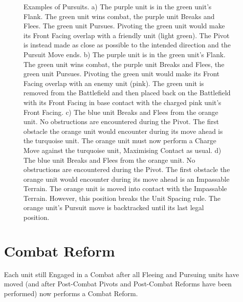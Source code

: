 \begin{figure}[!htbp]
\begin{minipage}{0.53\textwidth}
\def\svgwidth{\textwidth}

\end{minipage}\hfill\begin{minipage}{0.44\textwidth}
\caption{Examples of Pursuits.\captionpar
a) The purple unit is in the green unit's Flank. The green unit wins combat, the purple unit Breaks and Flees. The green unit Pursues. Pivoting the green unit would make its Front Facing overlap with a friendly unit (light green). The Pivot is instead made as close as possible to the intended direction and the Pursuit Move ends.\vspace*{1.5cm}\captionpar
b) The purple unit is in the green unit's Flank. The green unit wins combat, the purple unit Breaks and Flees, the green unit Pursues. Pivoting the green unit would make its Front Facing overlap with an enemy unit (pink). The green unit is removed from the Battlefield and then placed back on the Battlefield with its Front Facing in base contact with the charged pink unit's Front Facing.\vspace*{3.5cm}\captionpar
c) The blue unit Breaks and Flees from the orange unit. No obstructions are encountered during the Pivot. The first obstacle the orange unit would encounter during its move ahead is the turquoise unit. The orange unit must now perform a Charge Move against the turquoise unit, Maximising Contact as usual.\vspace*{4cm}\captionpar
d) The blue unit Breaks and Flees from the orange unit. No obstructions are encountered during the Pivot. The first obstacle the orange unit would encounter during its move ahead is an Impassable Terrain. The orange unit is moved into contact with the Impassable Terrain. However, this position breaks the Unit Spacing rule. The orange unit's Pursuit move is backtracked until its last legal position.\vspace*{1cm}}
\label{figure/pursuit}
\end{minipage}
\end{figure}

\clearpage
\section{Combat Reform}
\label{combat_reform}

Each unit still Engaged in a Combat after all Fleeing and Pursuing units have moved (and after Post-Combat Pivots and Post-Combat Reforms have been performed) now performs a Combat Reform.

